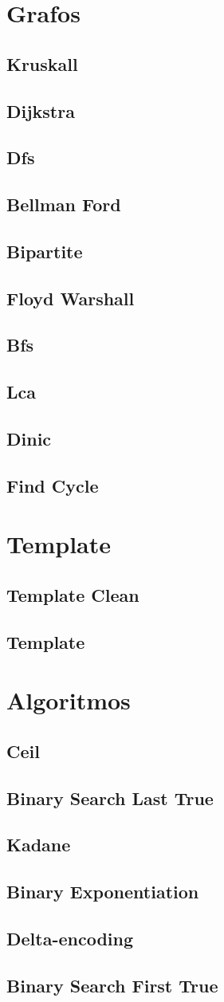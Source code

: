 \documentclass{article}
\newcommand\includes[2]{ %
   \subsection{#1}
   
}
\begin{document}
\begin{multicols}{2}
\section{Grafos}
\includes{Kruskall}{Materiais/Grafos/kruskall.cpp}
\includes{Dijkstra}{Materiais/Grafos/dijkstra.cpp}
\includes{Dfs}{Materiais/Grafos/dfs.cpp}
\includes{Bellman Ford}{Materiais/Grafos/bellman_ford.cpp}
\includes{Bipartite}{Materiais/Grafos/bipartite.cpp}
\includes{Floyd Warshall}{Materiais/Grafos/floyd_warshall.cpp}
\includes{Bfs}{Materiais/Grafos/bfs.cpp}
\includes{Lca}{Materiais/Grafos/lca.cpp}
\includes{Dinic}{Materiais/Grafos/dinic.cpp}
\includes{Find Cycle}{Materiais/Grafos/find_cycle.cpp}
\section{Template}
\includes{Template Clean}{Materiais/Template/template_clean.cpp}
\includes{Template}{Materiais/Template/template.cpp}
\section{Algoritmos}
\includes{Ceil}{Materiais/Algoritmos/ceil.cpp}
\includes{Binary Search Last True}{Materiais/Algoritmos/binary_search_last_true.cpp}
\includes{Kadane}{Materiais/Algoritmos/kadane.cpp}
\includes{Binary Exponentiation}{Materiais/Algoritmos/binary_exponentiation.cpp}
\includes{Delta-encoding}{Materiais/Algoritmos/delta-encoding.cpp}
\includes{Binary Search First True}{Materiais/Algoritmos/binary_search_first_true.cpp}

\end{multicols}
\end{document}
